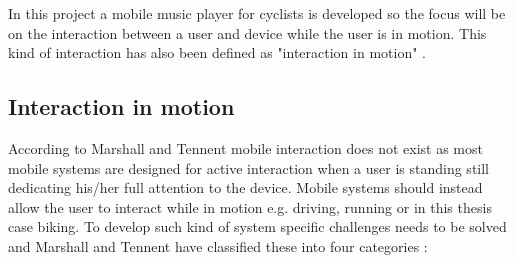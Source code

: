 In this project a mobile music player for cyclists is developed so the focus will be on the interaction between a user and device while the user is in motion. This kind of interaction has also been defined as "interaction in motion" \cite{marshall_mobile_2013}.

\subsection{Interaction in motion}
\label{sec:interactioninmotion}
According to Marshall and Tennent \cite{marshall_mobile_2013} mobile interaction does not exist as most mobile systems are designed for active interaction when a user is standing still dedicating his/her full attention to the device. Mobile systems should instead allow the user to interact while in motion e.g. driving, running or in this thesis case biking. To develop such kind of system specific challenges needs to be solved and Marshall and Tennent have classified these into four categories \cite{marshall_mobile_2013}:

